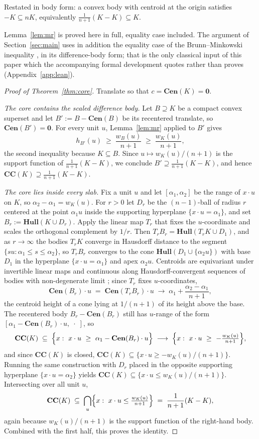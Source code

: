 \documentclass[12pt]{article}
\theoremstyle{definition}
\newcommand{\Hull}{\mathbf{Hull}}
\newcommand{\CC}{\mathbf{CC}}
\newcommand{\Cen}{\mathbf{Cen}}
\begin{document}
Restated in body form: a convex body with centroid at the origin
satisfies $-K\subseteq nK$, equivalently $\frac{1}{n+1}(K-K)\subseteq K$.

Lemma~\ref{lem:mr} is proved here in full, equality case included.  The
argument of Section~\ref{sec:main} uses in addition the equality case of the
Brunn--Minkowski inequality \cite[Thm.~7.1.1]{schneider}, in its
difference-body form; that is the only classical input of this paper which
the accompanying formal development quotes rather than proves
(Appendix~\ref{app:lean}).

\begin{proof}[Proof of Theorem~\ref{thm:core}]
Translate so that $c=\Cen(K)=\mathbf{0}$.

\smallskip\noindent
{\em The core contains the scaled difference body.}
Let $B\supseteq K$ be a compact convex superset and let
$B':=B-\Cen(B)$ be its recentered translate, so $\Cen(B')=\mathbf 0$.
For every unit $u$, Lemma~\ref{lem:mr} applied to $B'$ gives
\[
h_{B'}(u)\;\ge\;\frac{w_{B}(u)}{n+1}\;\ge\;\frac{w_K(u)}{n+1},
\]
the second inequality because $K\subseteq B$.  Since
$u\mapsto w_K(u)/(n+1)$ is the support function of
$\frac{1}{n+1}(K-K)$, we conclude
$B'\supseteq\frac{1}{n+1}(K-K)$, and hence
$\CC(K)\supseteq\frac{1}{n+1}(K-K)$.

\smallskip\noindent
{\em The core lies inside every slab.}
Fix a unit $u$ and let $[\alpha_1,\alpha_2]$ be the range of $x\cdot u$
on $K$, so $\alpha_2-\alpha_1=w_K(u)$.  For $r>0$ let $D_r$ be the
$(n-1)$-ball of radius $r$ centered at the point $\alpha_1 u$ inside the
supporting hyperplane $\{x\cdot u=\alpha_1\}$, and set
$B_r:=\Hull(K\cup D_r)$.  Apply the linear map $T_r$ that fixes the
$u$-coordinate and scales the orthogonal complement by $1/r$.  Then
$T_rB_r=\Hull(T_rK\cup D_1)$, and as $r\to\infty$ the bodies $T_rK$
converge in Hausdorff distance to the segment
$\{su:\alpha_1\le s\le\alpha_2\}$, so $T_rB_r$ converges to the cone
$\Hull(D_1\cup\{\alpha_2 u\})$ with base $D_1$ in the hyperplane
$\{x\cdot u=\alpha_1\}$ and apex $\alpha_2u$.  Centroids are equivariant
under invertible linear maps and continuous along Hausdorff-convergent
sequences of bodies with non-degenerate limit \cite{schneider}; since
$T_r$ fixes $u$-coordinates,
\[
\Cen(B_r)\cdot u \;=\;\Cen(T_rB_r)\cdot u
\;\longrightarrow\;
\alpha_1+\frac{\alpha_2-\alpha_1}{n+1},
\]
the centroid height of a cone lying at $1/(n+1)$ of its height above
the base.  The recentered body $B_r-\Cen(B_r)$ still has $u$-range of
the form $[\alpha_1-\Cen(B_r)\cdot u,\;\cdot\;]$, so
\[
\CC(K)\;\subseteq\;\Bigl\{x:\ x\cdot u\ \ge\
\alpha_1-\Cen(B_r)\cdot u\Bigr\}
\;\longrightarrow\;
\Bigl\{x:\ x\cdot u\ \ge\ -\tfrac{w_K(u)}{n+1}\Bigr\},
\]
and since $\CC(K)$ is closed, $\CC(K)\subseteq\{x\cdot u\ge
-w_K(u)/(n+1)\}$.  Running the same construction with $D_r$ placed in
the opposite supporting hyperplane $\{x\cdot u=\alpha_2\}$ yields
$\CC(K)\subseteq\{x\cdot u\le w_K(u)/(n+1)\}$.  Intersecting over all
unit $u$,
\[
\CC(K)\;\subseteq\;\bigcap_{u}\Bigl\{x:\ x\cdot u\le
\tfrac{w_K(u)}{n+1}\Bigr\}
\;=\;\frac{1}{n+1}(K-K),
\]
again because $w_K(u)/(n+1)$ is the support function of the right-hand
body.  Combined with the first half, this proves the identity.
\end{proof}
\end{document}
